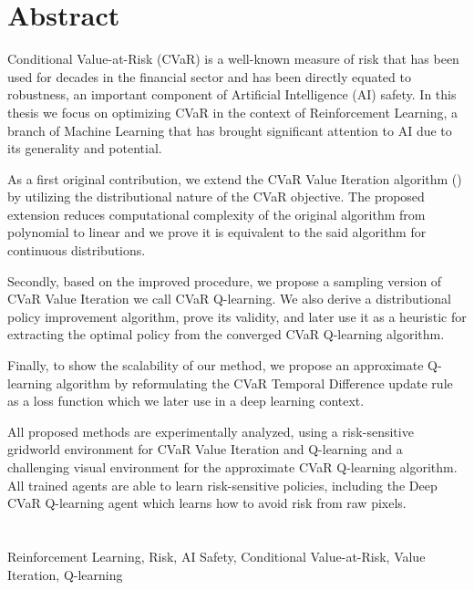 \begingroup
\let\clearpage\relax
\let\cleardoublepage\relax
\let\cleardoublepage\relax

\chapter*{Abstract}

Conditional Value-at-Risk (CVaR) is a well-known measure of risk that has been used for decades in the financial sector and has been directly equated to robustness, an important component of Artificial Intelligence (AI) safety. In this thesis we focus on optimizing CVaR in the context of Reinforcement Learning, a branch of Machine Learning that has brought significant attention to AI due to its generality and potential.

As a first original contribution, we extend the CVaR Value Iteration algorithm (\citet{chow2015risk}) by utilizing the distributional nature of the CVaR objective. The proposed extension reduces computational complexity of the original algorithm from polynomial to linear and we prove it is equivalent to the said algorithm for continuous distributions.

Secondly, based on the improved procedure, we propose a sampling version of CVaR Value Iteration we call CVaR Q-learning. We also derive a distributional policy improvement algorithm, prove its validity, and later use it as a heuristic for extracting the optimal policy from the converged CVaR Q-learning algorithm.

Finally, to show the scalability of our method, we propose an approximate Q-learning algorithm by reformulating the CVaR Temporal Difference update rule as a loss function which we later use in a deep learning context.

All proposed methods are experimentally analyzed, using a risk-sensitive gridworld environment for CVaR Value Iteration and Q-learning and a challenging visual environment for the approximate CVaR Q-learning algorithm. All trained agents are able to learn risk-sensitive policies, including the  Deep CVaR Q-learning agent which learns how to avoid risk from raw pixels.
\\
\\
\\
 Reinforcement Learning, Risk, AI Safety, Conditional Value-at-Risk, Value Iteration, Q-learning

